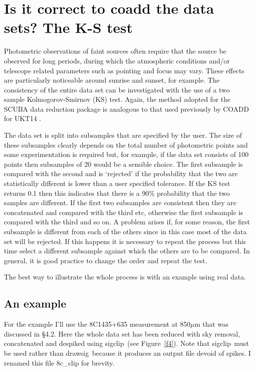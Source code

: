 \documentclass[twoside,11pt,fleqn]{article}
\newcommand{\task}[1]{{\sf #1}}
\newcommand{\sigclip}{\xref{\task{sigclip}}{sun216}{SIGCLIP}}
\newcommand{\drawsig}{\xref{\task{drawsig}}{sun95}{DRAWSIG}}
\newcommand{\xref}[3]{#1}
\begin{document}
{\section{Is it correct to coadd the data sets? The K-S test}

Photometric observations of faint sources often require that the
source be observed for long periods, during which the atmospheric
conditions and/or telescope related parameters such as pointing and
focus may vary. These effects are particularly noticeable around
sunrise and sunset, for example. The consistency of the entire data
set can be investigated with the use of a two sample
Kolmogorov-Smirnov (KS) test. Again, the method adopted for the SCUBA
data reduction package is analogous to that used previously by COADD
for UKT14 \cite{dhh}. 

The data set is split into subsamples that are specified by the
user. The size of these subsamples clearly depends on the total number
of photometric points and some experimentation is required but, for
example, if the data set consists of 100 points then subsamples of 20
would be a sensible choice. The first subsample is compared with the
second and is `rejected' if the probability that the two are
statistically different is lower than a user specified tolerance. If
the KS test returns 0.1 then this indicates that there is a 90\%
probability that the two samples are different. If the first two
subsamples are consistent then they are concatenated and compared with
the third etc, otherwise the first subsample is compared with the
third and so on. A problem arises if, for some reason, the first
subsample is different from each of the others since in this case most
of the data set will be rejected. If this happens it is necessary to
repeat the process but this time select a different subsample against
which the others are to be compared. In general, it is good practice
to change the order and repeat the test.

The best way to illustrate the whole process is with an example using 
real data.
 
\subsection{An example}

For the example I'll use the 8C1435+635 measurement at 850$\mu$m that was
discussed in \S 4.2. Here the whole data set has been reduced with sky
removal, concatenated and despiked using \sigclip\ (see Figure~\ref{f4}). Note
that \sigclip\ must be used rather than \drawsig\ because it produces an
output file devoid of spikes. I renamed this file 8c\_clip for brevity.

}
\end{document}
